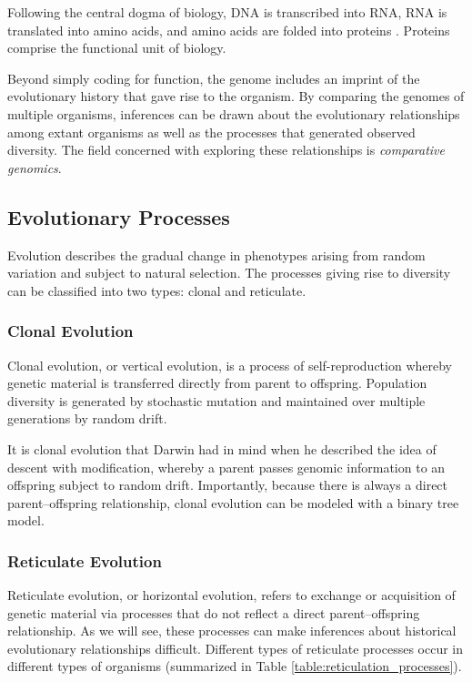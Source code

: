 Following the central dogma of biology, DNA is transcribed into RNA, RNA is translated into amino acids, and amino acids are folded into proteins \cite{Crick:1970wb}.
Proteins comprise the functional unit of biology.

Beyond simply coding for function, the genome includes an imprint of the evolutionary history that gave rise to the organism.
By comparing the genomes of multiple organisms, inferences can be drawn about the evolutionary relationships among extant organisms as well as the processes that generated observed diversity.
The field concerned with exploring these relationships is \emph{comparative genomics}.

\subsection{Evolutionary Processes}
\label{bg:bio:evolution}

Evolution describes the gradual change in phenotypes arising from random variation and subject to natural selection.
The processes giving rise to diversity can be classified into two types: clonal and reticulate.

\subsubsection{Clonal Evolution}
\label{bg:bio:evolution:clonal}

Clonal evolution, or vertical evolution, is a process of self-reproduction whereby genetic material is transferred directly from parent to offspring.
Population diversity is generated by stochastic mutation and maintained over multiple generations by random drift.

It is clonal evolution that Darwin had in mind when he described the idea of descent with modification, whereby a parent passes genomic information to an offspring subject to random drift.
Importantly, because there is always a direct parent--offspring relationship, clonal evolution can be modeled with a binary tree model.

\subsubsection{Reticulate Evolution}
\label{bg:bio:evolution:reticulate}

Reticulate evolution, or horizontal evolution, refers to exchange or acquisition of genetic material via processes that do not reflect a direct parent--offspring relationship.
As we will see, these processes can make inferences about historical evolutionary relationships difficult.
Different types of reticulate processes occur in different types of organisms (summarized in Table \ref{table:reticulation_processes}).

